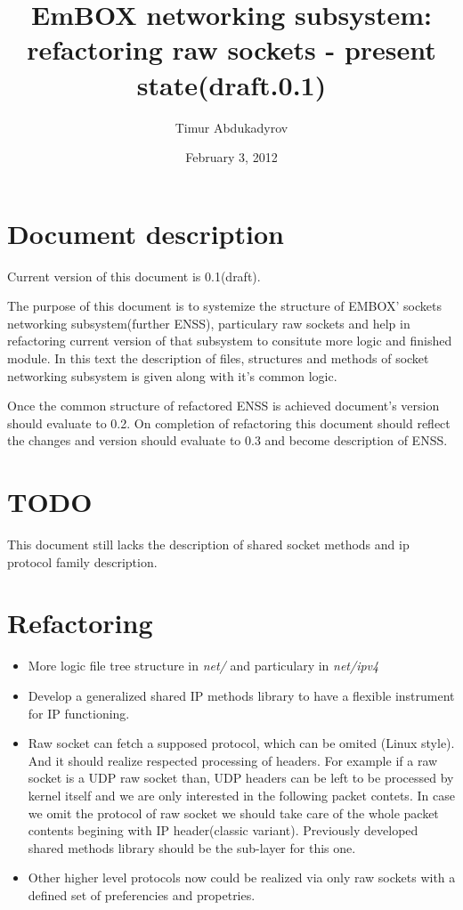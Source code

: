 \documentclass[12pt,a4paper]{article}
\begin{document}
\title{{\bf EmBOX} networking subsystem: refactoring raw sockets - present state(draft.0.1)}
\date{February 3, 2012}
\author{Timur Abdukadyrov}

\maketitle

\newpage
\tableofcontents

\newpage

\section{Document description}
\label{sec:description}
Current version of this document is 0.1(draft).

The purpose of this document is to systemize the structure of EMBOX' sockets
networking subsystem(further ENSS), particulary raw sockets and help in refactoring
current version of that subsystem to consitute more logic and finished module. In
this text the description of files, structures and methods of socket networking
subsystem is given along with it's common logic.

Once the common structure of refactored ENSS is achieved document's version should
evaluate to 0.2. On completion of refactoring this document should reflect the
changes and version should evaluate to 0.3 and become description of ENSS.

\newpage
\section{TODO}
This document still lacks the description of shared socket methods and ip protocol
family description.
\section{Refactoring}
\begin{itemize}
  \item More logic file tree structure in {\it net/} and particulary in
    {\it net/ipv4}
  \item Develop a generalized shared IP methods library to have a flexible
    instrument for IP functioning.
  \item Raw socket can fetch a supposed protocol, which can be omited (Linux
    style). And it should realize respected processing of headers. For example
    if a raw socket is a UDP raw socket than, UDP headers can be left to be
    processed by kernel itself and we are only interested in the following
    packet contets. In case we omit the protocol of raw socket we should take
    care of the whole packet contents begining with IP header(classic variant).
    Previously developed shared methods library should be the sub-layer for
    this one.
  \item Other higher level protocols now could be realized via only raw
    sockets with a defined set of preferencies and propetries.
\end{itemize}
\newpage
\end{document}
